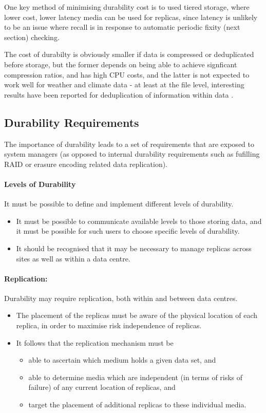 One key method of minimising durability cost is to used tiered storage, where
lower cost, lower latency media can be used for replicas, since latency is
unlikely to be an issue where recall is in response to automatic periodic
fixity (next section) checking.

The cost of durabilty is obviously smaller if data is compressed or deduplicated
before storage, but the former depends on being able to achieve signficant compression ratios, and has high CPU costs, and the latter is not expected
to work well for weather and climate data - at least at the file level, interesting results have been reported for deduplication of information within data \cite{gmd-10-413-2017}.

\subsection{Durability Requirements}

The importance of durability leads to a set of requirements that are
exposed to system managers (as opposed to internal durability requirements
such as fufilling RAID or erasure encoding related data replication).

\paragraph{Levels of Durability} It must be possible to define and implement different levels of durability.
  \begin{itemize}
      \item It must be possible to communicate available levels to those
      storing data, and it must be possible for such users to choose
      specific levels of durability.
      \item It should be recognised that it may be necessary to manage replicas across sites as well as within a data centre.
  \end{itemize}

  \paragraph{Replication:} Durability may require replication, both within and
  between data centres.
    \begin{itemize}
    \item The placement of the replicas must be aware of the physical location of each replica, in order to maximise risk independence of replicas.
    \item It follows that the replication mechanism must be
    \begin{itemize}
    \item able to ascertain which medium holds a given data set, and
    \item able to determine media which are independent (in terms of risks of failure) of any current location of replicas, and
    \item target the placement of additional replicas to these individual media.
    \end{itemize}
    \end{itemize}

